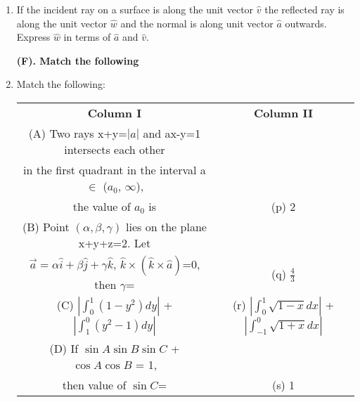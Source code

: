 \begin{enumerate}[label=\arabic*.,ref=\thesubsection.\theenumi]
\item If the incident ray on a surface is along the unit vector $\hat{v}$ the reflected ray is along the unit vector 
 $\hat{w}$ and the normal is along unit vector $\hat{a}$ outwards. Express $\hat{w}$ in terms of $\hat{a}$ and $\hat{v}$.

\textbf{(F). Match the following}

\item Match the following:
\begin{table}[ht!]
\centering
\begin{tabular}{c c} 
 \textbf{Column I} & \textbf{Column II}\\ [0.5ex] 
 (A) Two rays x+y=$|a|$ and ax-y=1
  intersects each other\\ in the first
  quadrant in the interval a 
  $\in$ ($a_0$, $\infty$), \\
  the value of $a_0$ is                                               &(p) 2\\ 
 (B) Point $(\alpha,\beta,\gamma)$ lies on the plane x+y+z=2. 
 Let\\ $\overrightarrow{a}=\alpha\hat{i}+\beta\hat{j}+\gamma\hat{k}$, 
 $\hat{k} \times (\hat{k} \times \hat{a})$=0, then $\gamma$=          &(q) $\frac{4}{3}$\\
 (C) $|\int_{0}^{1}(1-y^{2})dy|$ 
 + $|\int_{1}^{0}(y^{2}-1)dy|$                                        &(r) $|\int_{0}^{1}\sqrt{1-x}dx|$
                                                                           +$|\int_{-1}^{0}\sqrt{1+x}dx|$\\
 (D) If $\sin A \sin B \sin C$ + $\cos A \cos B$ = 1,\\ 
 then value of $\sin C$=                                              &(s) 1\\[1ex] 
\end{tabular}
\end{table}\\


\end{enumerate}

